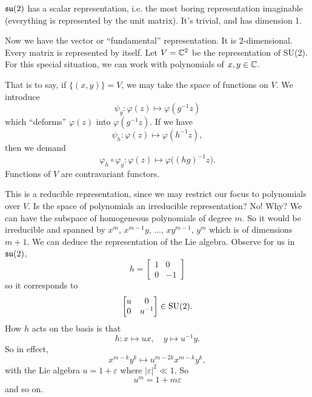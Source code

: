 \begin{rmk}
$\frak{su}(2)$ has a scalar representation, i.e. the most boring
  representation imaginable (everything is represented by the
  unit matrix). It's trivial, and has dimension 1.
\end{rmk}

Now we have the vector or ``fundamental'' representation. It is
2-dimensional. Every matrix is represented by itself. Let
$V=\Bbb{C}^{2}$ be the representation of SU(2). For this special
situation, we can work with polynomials of $x,y\in\Bbb{C}$.

That is to say, if $\{(x,y)\}=V$, we may take the space of
functions on $V$. We introduce
\begin{equation}
\psi_{g}\colon\varphi(z)\mapsto\varphi(g^{-1}z)
\end{equation}
which ``deforms'' $\varphi(z)$ into $\varphi(g^{-1}z)$. If we
have
\begin{equation}
\psi_{h}\colon\varphi(z)\mapsto\varphi(h^{-1}z),
\end{equation}
then we demand
\begin{equation}
\varphi_{h}\circ\varphi_{g}\colon\varphi(z)\mapsto\varphi\big((hg)^{-1}z\big).
\end{equation}
Functions of $V$ are contravariant functors.

This is a reducible representation, since we may restrict our
focus to polynomials over $V$. Is the space of polynomials an
irreducible representation? No! Why? We can have the subspace of
homogeneous polynomials of degree $m$. So it would be irreducible
and spanned by $x^{m}$, $x^{m-1}y$, ..., $xy^{m-1}$, $y^{m}$
which is of dimensions $m+1$. We can deduce the representation of
the Lie algebra. Observe for us in $\frak{su}(2)$,
\begin{equation}
h=\begin{bmatrix}
1 & 0\\
0 & -1
\end{bmatrix}
\end{equation}
so it corresponds to
\begin{equation}
\begin{bmatrix}
u & 0\\
0 & u^{-1}
\end{bmatrix}\in{\rm SU}(2).
\end{equation}
How $h$ acts on the basis is that
\begin{equation}
h\colon x\mapsto ux,\quad y\mapsto u^{-1}y.
\end{equation}
So in effect,
\begin{equation}
x^{m-k}y^{k}\mapsto u^{m-2k}x^{m-k}y^{k},
\end{equation}
with the Lie algebra $u=1+\varepsilon$ where
$|\varepsilon|^{2}\ll1$. So 
\begin{equation}
u^{m}=1+m\varepsilon
\end{equation}
and so on.
